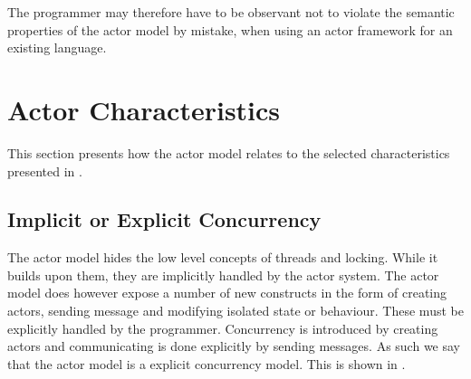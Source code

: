The programmer may therefore have to be observant not to violate the semantic properties of the actor model by mistake, when using an actor framework for an existing language.




\section{Actor Characteristics}\label{sec:actor_charac}
This section presents how the actor model relates to the selected characteristics presented in .

\subsection{Implicit or Explicit Concurrency}
The actor model hides the low level concepts of threads and locking. While it builds upon them, they are implicitly handled by the actor system. The actor model does however expose a number of new constructs in the form of creating actors, sending message and modifying isolated state or behaviour. These must be explicitly handled by the programmer. Concurrency is introduced by creating actors and communicating is done explicitly by sending messages. As such we say that the actor model is a explicit concurrency model. This is shown in .

